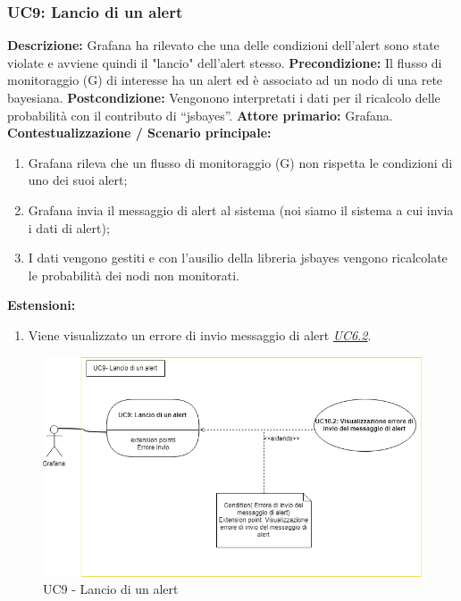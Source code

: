 		        \subsubsection{UC9: Lancio di un alert}
                    \textbf{Descrizione:} Grafana ha rilevato che una delle condizioni dell'alert sono state violate e avviene quindi il "lancio" dell'alert stesso.
                    \newline
                    \textbf{Precondizione:} Il flusso di monitoraggio (G) di interesse ha un alert ed è associato ad un nodo di una rete bayesiana.
                    \newline
                    \textbf{Postcondizione:} Vengonono interpretati i dati per il ricalcolo delle probabilità con il contributo di “jsbayes”.
                    \newline
                    \textbf{Attore primario:} Grafana.
                    \newline
                    \textbf{Contestualizzazione / Scenario principale:} \begin{enumerate}
                            \item Grafana rileva che un flusso di monitoraggio (G) non rispetta le condizioni di uno dei suoi alert;
                            \item Grafana invia il messaggio di alert al sistema (noi siamo il sistema a cui invia i dati di alert);
                            \item I dati vengono gestiti e con l’ausilio della libreria jsbayes vengono ricalcolate le probabilità dei nodi non monitorati.
                        \end{enumerate}
                    
                    \textbf{Estensioni:} 
                    \begin{enumerate}
                        \item Viene visualizzato un errore di invio messaggio di alert \underline{\textit{UC6.2}}.
                    \end{enumerate}
                    
                	\begin{figure}[!htbp]
                    	\centering
                    	\includegraphics[width=\textwidth]{UC9.png}
                    	\caption{UC9 - Lancio di un alert}
                    \end{figure}
                \clearpage
                        

